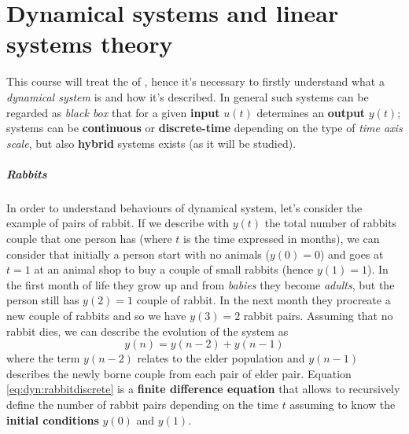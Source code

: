 \chapter{Dynamical systems and linear systems theory}

	This course will treat the  of , hence it's necessary to firstly understand what a \textit{dynamical system} is and how it's described. In general such systems can be regarded as \textit{black box} that for a given \textbf{input} $u(t)$ determines an \textbf{output} $y(t)$; systems can be \textbf{continuous} or \textbf{discrete-time} depending on the type of \textit{time axis scale}, but also \textbf{hybrid} systems exists (as it will be studied).
	
	\paragraph{Rabbits} In order to understand behaviours of dynamical system, let's consider the example of pairs of rabbit. If we describe with $y(t)$ the total number of rabbits couple that one person has (where $t$ is the time expressed in months), we can consider that initially a person start with no animals ($y(0) = 0$) and goes at $t=1$ at an animal shop to buy a couple of small rabbits (hence $y(1) = 1$). In the first month of life they grow up and from \textit{babies} they become \textit{adults}, but the person still has $y(2) = 1$ couple of rabbit. In the next month they procreate a new couple of rabbits and so we have $y(3) = 2$ rabbit pairs. Assuming that no rabbit dies, we can describe the evolution of the system as
	\begin{equation} \label{eq:dyn:rabbitdiscrete}
		y(n) = y(n-2) + y(n-1)
	\end{equation}
	where the term $y(n-2)$ relates to the elder population and $y(n-1)$ describes the newly borne couple from each pair of elder pair. Equation \ref{eq:dyn:rabbitdiscrete} is a \textbf{finite difference equation} that allows to recursively define the number of rabbit pairs depending on the time $t$ assuming to know the \textbf{initial conditions} $y(0)$ and $y(1)$.
	
